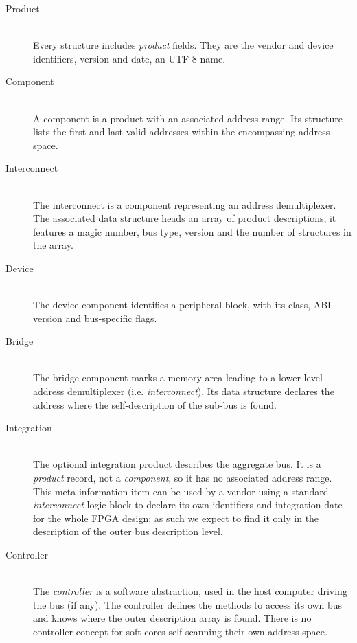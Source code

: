 \documentclass[a4paper, 12pt]{article}
\begin{document}
\begin{description}
\item[Product] \hfill \\
Every structure includes \textit{product} fields. They are
the vendor and device identifiers, version and date, an UTF-8
name.

\item[Component] \hfill \\
A component is a product with an associated address range. Its
structure lists the first and last valid addresses within
the encompassing address space.

\item[Interconnect] \hfill \\
The interconnect is a component representing an address demultiplexer.
The associated data structure heads an array of product descriptions,
it features a magic number, bus type, version and the number of
structures in the array.

\item[Device] \hfill \\
The device component identifies a peripheral block, with
its class, ABI version and bus-specific flags.

\item[Bridge] \hfill \\
The bridge component marks a memory area leading to a lower-level
address demultiplexer (i.e. \textit{interconnect}). Its data
structure declares the address where the self-description of the
sub-bus is found.

\item[Integration] \hfill \\
The optional integration product describes the aggregate bus.
It is a \textit{product} record, not a
\textit{component}, so it has no associated address range. This
meta-information item can be used by a vendor using a standard
\textit{interconnect} logic block to declare its own
identifiers and integration date for the whole FPGA design; as
such we expect to find it only in the description of the
outer bus description level.

\item[Controller] \hfill \\
The \textit{controller} is a software abstraction, used in the host
computer driving the bus (if any). The controller defines the
methods to access its own bus and knows where the outer description
array is found.  There is no controller concept for soft-cores
self-scanning their own address space.

\end{description}
\end{document}
